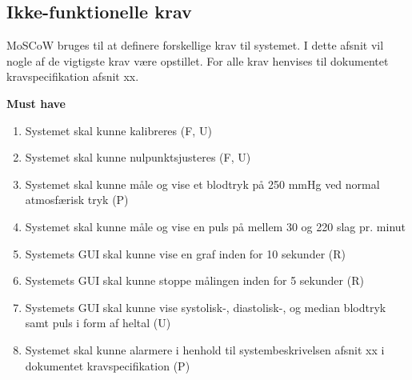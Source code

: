\subsection{Ikke-funktionelle krav}
\vspace{0.3 cm}
MoSCoW bruges til at definere forskellige krav til systemet. I dette afsnit vil nogle af de vigtigste krav være opstillet. For alle krav henvises til dokumentet kravspecifikation afsnit xx. 

\vspace{0.5 cm}
\textbf{Must have}
\begin{enumerate}
	\item Systemet skal kunne kalibreres (F, U)
	\item Systemet skal kunne nulpunktsjusteres (F, U)
	\item Systemet skal kunne måle og vise et blodtryk på 250 mmHg ved normal atmosfærisk tryk (P)
	\item Systemet skal kunne måle og vise en puls på mellem 30 og 220 slag pr. minut
	\item Systemets GUI skal kunne vise en graf inden for 10 sekunder (R)
	\item Systemets GUI skal kunne stoppe målingen inden for 5 sekunder (R)
	\item Systemets GUI skal kunne vise systolisk-, diastolisk-, og median blodtryk samt puls i form af heltal (U)
	\item Systemet skal kunne alarmere i henhold til systembeskrivelsen afsnit xx i dokumentet kravspecifikation (P)
\end{enumerate}

 
\clearpage